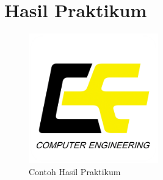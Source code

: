 \chapter*{Hasil Praktikum}



\lipsum[1-2] %

\begin{figure}
    \centering
    \includegraphics[width=0.5\textwidth]{images/logo-tekkom.png} %
    \caption{Contoh Hasil Praktikum} %
    \label{fig:hasil_praktikum} %
\end{figure}

